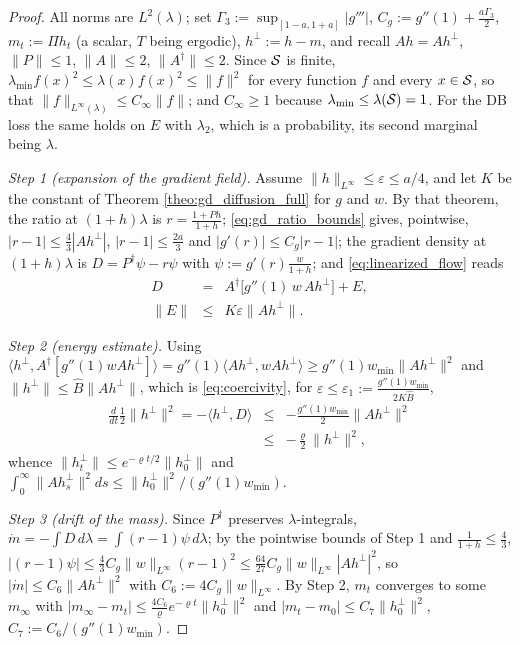 \begin{proof}
All norms are $L^2(\lambda)$; set $\Gamma_3:=\sup_{[1-a,1+a]}|g'''|$, $C_g:=g''(1)+\frac{a\Gamma_3}2$, $m_t:=\Pi h_t$ (a scalar, $T$ being ergodic), $h^\perp:=h-m$, and recall $Ah=Ah^\perp$, $\|P\|\leq1$, $\|A\|\leq2$, $\|A^\dagger\|\leq2$. Since $\mathcal S$ is finite, $\lambda_{\min}f(x)^2\leq\lambda(x)f(x)^2\leq\|f\|^2$ for every function $f$ and every $x\in\mathcal S$, so that $\|f\|_{L^\infty(\lambda)}\leq C_\infty\|f\|$; and $C_\infty\geq1$ because $\lambda_{\min}\leq\lambda(\mathcal S)=1$. For the DB loss the same holds on $E$ with $\lambda_2$, which is a probability, its second marginal being $\lambda$.

\emph{Step 1 (expansion of the gradient field).} Assume $\|h\|_{L^\infty}\leq\varepsilon\leq a/4$, and let $K$ be the constant of Theorem \ref{theo:gd_diffusion_full} for $g$ and $w$. By that theorem, the ratio at $(1+h)\lambda$ is $r=\frac{1+Ph}{1+h}$; \eqref{eq:gd_ratio_bounds} gives, pointwise, $|r-1|\leq\frac43|Ah^\perp|$, $|r-1|\leq\frac{2a}3$ and $|g'(r)|\leq C_g|r-1|$; the gradient density at $(1+h)\lambda$ is $D=P^\dagger\psi-r\psi$ with $\psi:=g'(r)\frac w{1+h}$; and \eqref{eq:linearized_flow} reads
\begin{eqnarray}
    D &=& A^\dagger\bigl[g''(1)\,w\,Ah^\perp\bigr]+E,\label{eq:gradient_expansion}\\
    \|E\|&\leq& K\varepsilon\|Ah^\perp\|.\nonumber
\end{eqnarray}

\emph{Step 2 (energy estimate).} Using $\langle h^\perp, A^\dagger[g''(1)wAh^\perp]\rangle=g''(1)\langle Ah^\perp,wAh^\perp\rangle\geq g''(1)w_{\min}\|Ah^\perp\|^2$ and $\|h^\perp\|\leq\widehat B\|Ah^\perp\|$, which is \eqref{eq:coercivity}, for $\varepsilon\leq\varepsilon_1:=\frac{g''(1)w_{\min}}{2K\widehat B}$,
\begin{eqnarray*}
    \frac{d}{dt}\frac12\|h^\perp\|^2=-\langle h^\perp,D\rangle&\leq&-\frac{g''(1)w_{\min}}2\|Ah^\perp\|^2\\
    &\leq&-\frac\varrho2\|h^\perp\|^2,
\end{eqnarray*}
whence $\|h_t^\perp\|\leq e^{-\varrho t/2}\|h_0^\perp\|$ and $\int_0^\infty\|Ah_s^\perp\|^2ds\leq\|h_0^\perp\|^2/(g''(1)w_{\min})$.

\emph{Step 3 (drift of the mass).} Since $P^\dagger$ preserves $\lambda$-integrals, $\dot m=-\int D\,d\lambda=\int(r-1)\psi\,d\lambda$; by the pointwise bounds of Step 1 and $\frac1{1+h}\leq\frac43$, $|(r-1)\psi|\leq\frac43C_g\|w\|_{L^\infty}(r-1)^2\leq\frac{64}{27}C_g\|w\|_{L^\infty}|Ah^\perp|^2$, so $|\dot m|\leq C_6\|Ah^\perp\|^2$ with $C_6:=4C_g\|w\|_{L^\infty}$. By Step 2, $m_t$ converges to some $m_\infty$ with $|m_\infty-m_t|\leq\frac{4C_6}\varrho e^{-\varrho t}\|h_0^\perp\|^2$ and $|m_t-m_0|\leq C_7\|h_0^\perp\|^2$, $C_7:=C_6/(g''(1)w_{\min})$.


\end{proof}
